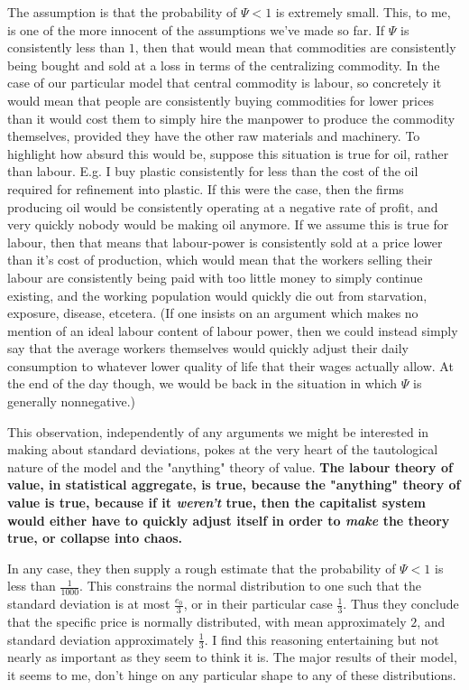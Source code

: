 The assumption is that the probability of $\Psi < 1$ is extremely small. This, to me, is one of the more innocent of the assumptions we've made so far. If $\Psi$ is consistently less than $1$, then that would mean that commodities are consistently being bought and sold at a loss in terms of the centralizing commodity. In the case of our particular model that central commodity is labour, so concretely it would mean that people are consistently buying commodities for lower prices than it would cost them to simply hire the manpower to produce the commodity themselves, provided they have the other raw materials and machinery. To highlight how absurd this would be, suppose this situation is true for oil, rather than labour. E.g. I buy plastic consistently for less than the cost of the oil required for refinement into plastic. If this were the case, then the firms producing oil would be consistently operating at a negative rate of profit, and very quickly nobody would be making oil anymore. If we assume this is true for labour, then that means that labour-power is consistently sold at a price lower than it's cost of production, which would mean that the workers selling their labour are consistently being paid with too little money to simply continue existing, and the working population would quickly die out from starvation, exposure, disease, etcetera. (If one insists on an argument which makes no mention of an ideal labour content of labour power, then we could instead simply say that the average workers themselves would quickly adjust their daily consumption to whatever lower quality of life that their wages actually allow. At the end of the day though, we would be back in the situation in which $\Psi$ is generally nonnegative.)  \par 
 This observation, independently of any arguments we might be interested in making about standard deviations, pokes at the very heart of the tautological nature of the model and the "anything" theory of value. \textbf{The labour theory of value, in statistical aggregate, is true, because the "anything" theory of value is true, because if it \textit{weren't} true, then the capitalist system would either have to quickly adjust itself in order to \textit{make} the theory true, or collapse into chaos.} \par 
 In any case, they then supply a rough estimate that the probability of $\Psi < 1$ is less than $\frac{1}{1000}$. This constrains the normal distribution to one such that the standard deviation is at most $\frac{e_0}{3}$, or in their particular case $\frac{1}{3}$. Thus they conclude that the specific price is normally distributed, with mean approximately $2$, and standard deviation approximately $\frac{1}{3}$. I find this reasoning entertaining but not nearly as important as they seem to think it is. The major results of their model, it seems to me, don't hinge on any particular shape to any of these distributions. 


